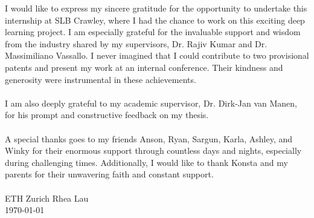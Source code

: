 

I would like to express my sincere gratitude for the opportunity to undertake this internship at SLB Crawley, where I had the chance to work on this exciting deep learning project. I am especially grateful for the invaluable support and wisdom from the industry shared by my supervisors, Dr. Rajiv Kumar and Dr. Massimiliano Vassallo. I never imagined that I could contribute to two provisional patents and present my work at an internal conference. Their kindness and generosity were instrumental in these achievements.
\\\\
I am also deeply grateful to my academic supervisor, Dr. Dirk-Jan van Manen, for his prompt and constructive feedback on my thesis.
\\\\
A special thanks goes to my friends Anson, Ryan, Sargun, Karla, Ashley, and Winky for their enormous support through countless days and nights, especially during challenging times. Additionally, I would like to thank Konsta and my parents for their unwavering faith and constant support.
\\\\
ETH Zurich  \hfill Rhea Lau
\\
\today
